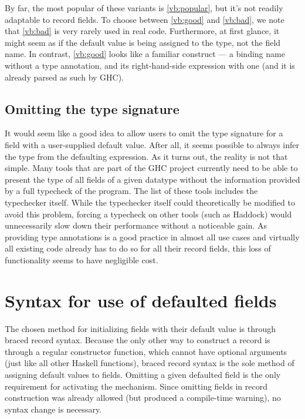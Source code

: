 \documentclass[en]{pracamgr}
\begin{document}
By far, the most popular of these variants is \ref*{vb:popular}, but it's not readily adaptable to record fields.
To choose between \ref*{vb:good} and \ref*{vb:bad}, we note that \ref*{vb:bad} is very rarely used in real code.
Furthermore, at first glance, it might seem as if the default value is being assigned to the type, not the field name.
In contrast, \ref*{vb:good} looks like a familiar construct --- a binding name without a type annotation, and its right-hand-side expression with one (and it is already parsed as such by GHC).

\subsection{Omitting the type signature}
It would seem like a good idea to allow users to omit the type signature for a field with a user-supplied default value.
After all, it seems possible to always infer the type from the defaulting expression.
As it turns out, the reality is not that simple.
Many tools that are part of the GHC project currently need to be able to present the type of all fields of a given datatype without the information provided by a full typecheck of the program.
The list of these tools includes the typechecker itself.
While the typechecker itself could theoretically be modified to avoid this problem, forcing a typecheck on other tools (such as Haddock) would unnecessarily slow down their performance without a noticeable gain.
As providing type annotations is a good practice in almost all use cases and virtually all existing code already has to do so for all their record fields, this loss of functionality seems to have negligible cost.


\section{Syntax for use of defaulted fields}

The chosen method for initializing fields with their default value is through braced record syntax.
Because the only other way to construct a record is through a regular constructor function, which cannot have optional arguments (just like all other Haskell functions), braced record syntax is the sole method of assigning default values to fields.
Omitting a given defaulted field is the only requirement for activating the mechanism. 
Since omitting fields in record construction was already allowed (but produced a compile-time warning), no syntax change is necessary.
\end{document}
